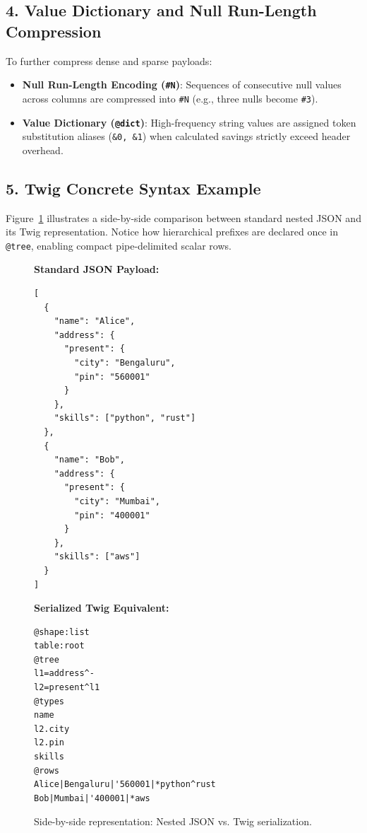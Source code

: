 \documentclass[11pt,a4paper]{article}
\begin{document}
\subsection{4. Value Dictionary and Null Run-Length Compression}
To further compress dense and sparse payloads:
\begin{itemize}
    \item \textbf{Null Run-Length Encoding (\texttt{\#N})}: Sequences of consecutive null values across columns are compressed into \texttt{\#N} (e.g., three nulls become \texttt{\#3}).
    \item \textbf{Value Dictionary (\texttt{@dict})}: High-frequency string values are assigned token substitution aliases (\texttt{\&0, \&1}) when calculated savings strictly exceed header overhead.
\end{itemize}

\subsection{5. Twig Concrete Syntax Example}
Figure~\ref{fig:syntax_comparison} illustrates a side-by-side comparison between standard nested JSON and its Twig representation. Notice how hierarchical prefixes are declared once in \texttt{@tree}, enabling compact pipe-delimited scalar rows.

\begin{figure}[htbp]
\centering
\small
\begin{minipage}{0.48\textwidth}
\textbf{Standard JSON Payload:}
\begin{lstlisting}
[
  {
    "name": "Alice",
    "address": {
      "present": {
        "city": "Bengaluru",
        "pin": "560001"
      }
    },
    "skills": ["python", "rust"]
  },
  {
    "name": "Bob",
    "address": {
      "present": {
        "city": "Mumbai",
        "pin": "400001"
      }
    },
    "skills": ["aws"]
  }
]
\end{lstlisting}
\end{minipage}
\hfill
\begin{minipage}{0.48\textwidth}
\textbf{Serialized Twig Equivalent:}
\begin{lstlisting}
@shape:list
table:root
@tree
l1=address^-
l2=present^l1
@types
name
l2.city
l2.pin
skills
@rows
Alice|Bengaluru|'560001|*python^rust
Bob|Mumbai|'400001|*aws
\end{lstlisting}
\end{minipage}
\caption{Side-by-side representation: Nested JSON vs. Twig serialization.}
\label{fig:syntax_comparison}
\end{figure}
\end{document}
